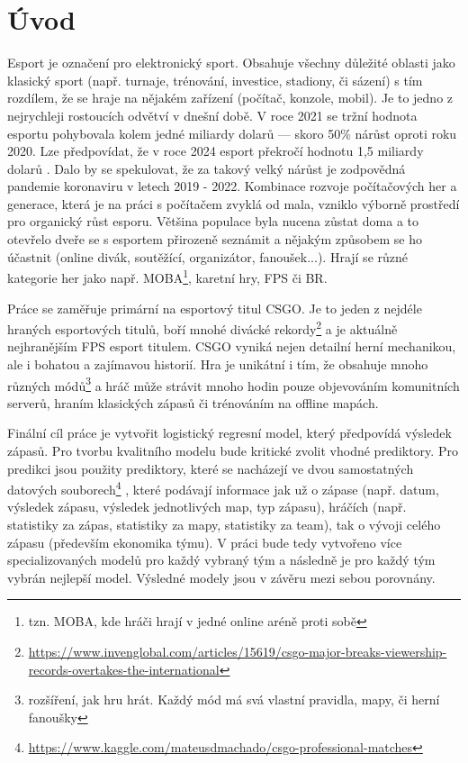 \chapter{Úvod}
Esport je označení pro elektronický sport. Obsahuje všechny důležité oblasti jako klasický sport (např. turnaje, trénování, investice, stadiony, či sázení)
s tím rozdílem, že se hraje na nějakém zařízení (počítač, konzole, mobil).
Je to jedno z nejrychleji rostoucích odvětví v dnešní době. V roce 2021 se tržní hodnota esportu pohybovala kolem jedné miliardy dolarů --- skoro
50\% nárůst oproti roku 2020. Lze předpovídat, že v roce 2024 esport překročí hodnotu 1,5 miliardy dolarů \cite{Gough2021}.
Dalo by se spekulovat, že za takový velký nárůst je zodpovědná 
{\color{red}
pandemie koronaviru v letech 2019 - 2022. Kombinace rozvoje počítačových her a generace, která je na práci s počítačem zvyklá od mala, vzniklo výborně prostředí
pro organický růst esporu.
}
Většina populace
{\color{red}
byla
} nucena zůstat doma a to otevřelo dveře
se s esportem přirozeně seznámit a nějakým způsobem se ho účastnit (online divák, soutěžící, organizátor, fanoušek...). 
Hrají se různé kategorie her jako např. \ac{MOBA}\footnote{tzn. MOBA, kde hráči hrají v jedné online aréně proti sobě},
karetní hry, \ac{FPS} či \ac{BR}.

Práce se zaměřuje primární na esportový titul \acf{CSGO}. Je to jeden z nejdéle hraných esportových titulů, boří mnohé divácké
rekordy\footnote{\scriptsize \url{https://www.invenglobal.com/articles/15619/csgo-major-breaks-viewership-records-overtakes-the-international}}
a je aktuálně nejhranějším \ac{FPS} esport titulem. \ac{CSGO} vyniká nejen detailní herní mechanikou, ale i bohatou a zajímavou historií. Hra
je unikátní i tím, že obsahuje mnoho různých módů\footnote{rozšíření, jak hru hrát. Každý mód má svá vlastní pravidla, mapy, či herní fanoušky}
a hráč může strávit mnoho hodin pouze objevováním komunitních serverů, hraním klasických zápasů či trénováním na offline mapách.

Finální cíl práce je vytvořit logistický regresní model, který předpovídá výsledek zápasů. Pro tvorbu kvalitního modelu bude kritické zvolit vhodné prediktory.
Pro predikci jsou použity prediktory, které se nacházejí ve dvou samostatných datových souborech\footnote{\url{https://www.kaggle.com/mateusdmachado/csgo-professional-matches}} 
, které podávají informace jak už o zápase (např. datum, 
výsledek zápasu, výsledek jednotlivých map, typ zápasu), hráčích (např. statistiky za zápas, statistiky za mapy, statistiky za team), tak o 
vývoji celého zápasu (především ekonomika týmu). V práci bude tedy vytvořeno více specializovaných modelů pro každý vybraný tým a následně
je pro každý tým vybrán nejlepší model. Výsledné modely jsou v závěru mezi sebou porovnány.

